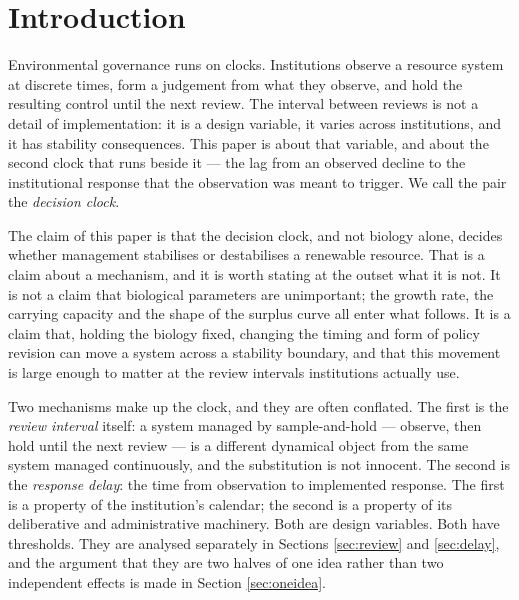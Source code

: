 
\section{Introduction}
\label{sec:intro}

Environmental governance runs on clocks. Institutions observe a resource system at
discrete times, form a judgement from what they observe, and hold the resulting control
until the next review. The interval between reviews is not a detail of implementation: it
is a design variable, it varies across institutions, and it has stability consequences.
This paper is about that variable, and about the second clock that runs beside it --- the
lag from an observed decline to the institutional response that the observation was meant
to trigger. We call the pair the \emph{decision clock}.

The claim of this paper is that the decision clock, and not biology alone, decides whether
management stabilises or destabilises a renewable resource. That is a claim about a
mechanism, and it is worth stating at the outset what it is not. It is not a claim that
biological parameters are unimportant; the growth rate, the carrying capacity and the
shape of the surplus curve all enter what follows. It is a claim that, holding the biology
fixed, changing the timing and form of policy revision can move a system across a
stability boundary, and that this movement is large enough to matter at the review
intervals institutions actually use.

Two mechanisms make up the clock, and they are often conflated. The first is the
\emph{review interval} itself: a system managed by sample-and-hold --- observe, then hold
until the next review --- is a different dynamical object from the same system managed
continuously, and the substitution is not innocent. The second is the \emph{response
delay}: the time from observation to implemented response. The first is a property of the
institution's calendar; the second is a property of its deliberative and administrative
machinery. Both are design variables. Both have thresholds. They are analysed separately
in Sections \ref{sec:review} and \ref{sec:delay}, and the argument that they are two
halves of one idea rather than two independent effects is made in Section
\ref{sec:oneidea}.

